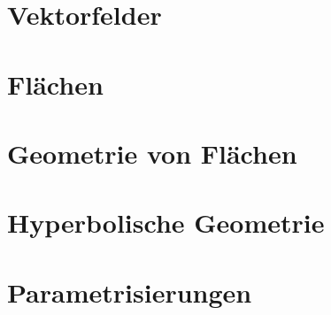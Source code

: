 \documentclass[a4paper,11pt]{article} %
\theoremstyle{costum} %
\begin{document}
\section{Vektorfelder}

\vspace{3ex}
\section{Flächen}

\vspace{3ex}
\section{Geometrie von Flächen}
\section{Hyperbolische Geometrie}

\vspace{3ex}
\section{Parametrisierungen}

\vspace{3ex}
\end{document}
